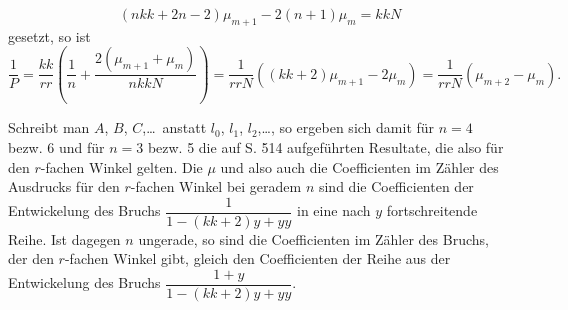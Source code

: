 \[
(nkk+2n-2)\mu_{m+1}-2(n+1)\mu_m=kkN
\]
\noindent gesetzt, so ist
\[
\frac1P=\frac{kk}{rr}\left(\frac1n+\frac{2(\mu_{m+1}+\mu_m)}{nkkN}\right)
=\frac1{rrN}((kk+2)\mu_{m+1}-2\mu_m)=\frac1{rrN}(\mu_{m+2}-\mu_m).
\]
\par\noindent\hspace*{\parindent}Schreibt man $A$, $B$, $C$,\ldots\ anstatt $l_0$, $l_1$, $l_2$,\ldots, so ergeben sich damit für $n=4$ bezw. 6 und für $n=3$ bezw. 5 die auf S. 514 aufgeführten Resultate, die also für den $r$-fachen Winkel gelten. Die $\mu$ und also auch die Coefficienten im Zähler des Ausdrucks für den $r$-fachen Winkel bei geradem $n$ sind die Coefficienten der Entwickelung des Bruchs $\dfrac1{1-(kk+2)y+yy}$ in eine nach $y$ fortschreitende Reihe. Ist dagegen $n$ ungerade, so sind die Coefficienten im Zähler des Bruchs, der den $r$-fachen Winkel gibt, gleich den Coefficienten der Reihe aus der Entwickelung des Bruchs $\dfrac{1+y}{1-(kk+2)y+yy}$.
\par\endgroup
